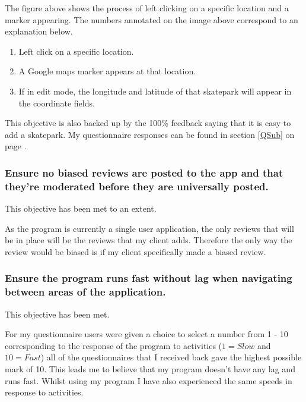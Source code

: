 The figure above shows the process of left clicking on a specific location and a marker appearing. The numbers annotated on the image above correspond to an explanation below.

\begin{enumerate}
\item Left click on a specific location.
\item A Google maps marker appears at that location.
\item If in edit mode, the longitude and latitude of that skatepark will appear in the coordinate fields.
\end{enumerate}

This objective is also backed up by the 100\% feedback saying that it is easy to add a skatepark. My questionnaire responses can be found in section \ref{QSub} on page \pageref{QSub}.




\subsubsection {Ensure no biased reviews are posted to the app and that they're moderated before they are universally posted.}

This objective has been met to an extent.

As the program is currently a single user application, the only reviews that will be in place will be the reviews that my client adds. Therefore the only way the review would be biased is if my client specifically made a biased review. 



\subsubsection {Ensure the program runs fast without lag when navigating between areas of the application.}  %

This objective has been met.

For my questionnaire users were given a choice to select a number from 1 - 10 corresponding to the response of the program to activities ($1 = Slow$ and $10 = Fast$) all of the questionnaires that I received back gave the highest possible mark of 10. This leads me to believe that my program doesn't have any lag and runs fast. Whilst using my program I have also experienced the same speeds in response to activities.








